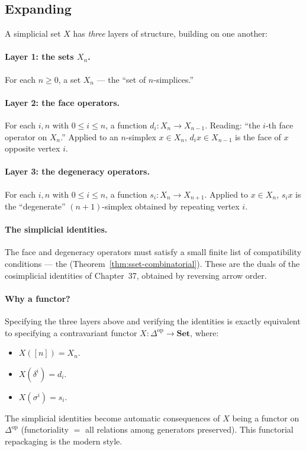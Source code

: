 \subsection{Expanding}

A simplicial set $X$ has \emph{three} layers of structure, building on
one another:

\paragraph{Layer 1: the sets $X_n$.}
For each $n \geq 0$, a set $X_n$ — the ``set of $n$-simplices.''

\paragraph{Layer 2: the face operators.}
For each $i, n$ with $0 \leq i \leq n$, a function $d_i : X_n \to
X_{n-1}$. Reading: ``the $i$-th face operator on $X_n$.'' Applied to an
$n$-simplex $x \in X_n$, $d_i x \in X_{n-1}$ is the face of $x$
opposite vertex $i$.

\paragraph{Layer 3: the degeneracy operators.}
For each $i, n$ with $0 \leq i \leq n$, a function $s_i : X_n \to
X_{n+1}$. Applied to $x \in X_n$, $s_i x$ is the ``degenerate''
$(n+1)$-simplex obtained by repeating vertex $i$.

\paragraph{The simplicial identities.}
The face and degeneracy operators must satisfy a small finite list of
compatibility conditions — the 
(Theorem~\ref{thm:sset-combinatorial}). These are the duals of the
cosimplicial identities of Chapter~37, obtained by reversing arrow order.

\paragraph{Why a functor?}
Specifying the three layers above and verifying the identities is
exactly equivalent to specifying a contravariant functor $X :
\Delta^{\mathrm{op}} \to \mathbf{Set}$, where:
\begin{itemize}
  \item $X([n]) = X_n$.
  \item $X(\delta^i) = d_i$.
  \item $X(\sigma^i) = s_i$.
\end{itemize}
The simplicial identities become automatic consequences of $X$ being a
functor on $\Delta^{\mathrm{op}}$ (functoriality $=$ all relations among
generators preserved). This functorial repackaging is the modern style.

